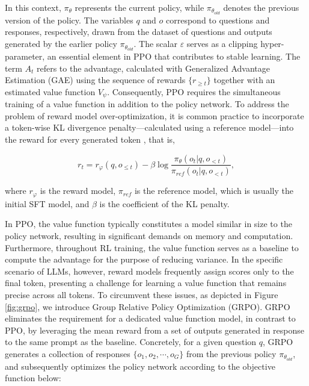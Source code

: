 \begin{itemize}[topsep=0pt]
In this context, $\pi_{\theta}$ represents the current policy, while $\pi_{\theta_{old}}$ denotes the previous version of the policy. The variables $q$ and $o$ correspond to questions and responses, respectively, drawn from the dataset of questions and outputs generated by the earlier policy $\pi_{\theta_{old}}$. The scalar $\varepsilon$ serves as a clipping hyper-parameter, an essential element in PPO that contributes to stable learning. The term $A_t$ refers to the advantage, calculated with Generalized Advantage Estimation (GAE) \citep{gae} using the sequence of rewards $\{r_{\ge t}\}$ together with an estimated value function $V_{\psi}$. Consequently, PPO requires the simultaneous training of a value function in addition to the policy network. To address the problem of reward model over-optimization, it is common practice to incorporate a token-wise KL divergence penalty—calculated using a reference model—into the reward for every generated token \citep{ouyang2022training}, that is,

\begin{equation}
    r_{t} = r_\varphi(q, o_{\le t}) - \beta \log\frac{\pi_{\theta}(o_{t}|q, o_{<t})}{\pi_{ref}(o_{t}|q, o_{<t})},
\label{eq:PPO-reward}
\end{equation}

where $r_\varphi$  is the reward model, $\pi_{ref}$ is the reference model, which is usually the initial SFT model, and $\beta$  is the coefficient of the KL penalty.

In PPO, the value function typically constitutes a model similar in size to the policy network, resulting in significant demands on memory and computation. Furthermore, throughout RL training, the value function serves as a baseline to compute the advantage for the purpose of reducing variance. In the specific scenario of LLMs, however, reward models frequently assign scores only to the final token, presenting a challenge for learning a value function that remains precise across all tokens. To circumvent these issues, as depicted in Figure \ref{fig:grpo}, we introduce Group Relative Policy Optimization (GRPO). GRPO eliminates the requirement for a dedicated value function model, in contrast to PPO, by leveraging the mean reward from a set of outputs generated in response to the same prompt as the baseline. Concretely, for a given question $q$, GRPO generates a collection of responses $\{o_1, o_2, \cdots, o_G\}$ from the previous policy $\pi_{\theta_{old}}$, and subsequently optimizes the policy network according to the objective function below:


\end{itemize}
